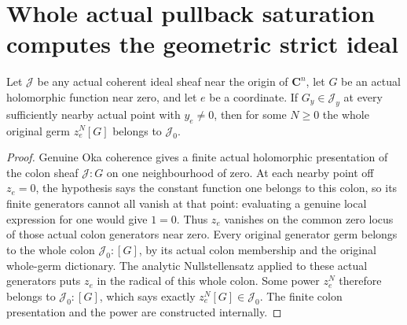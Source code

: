 \section{Whole actual pullback saturation computes the geometric strict ideal}

\begin{theorem}
\label{hir:actual-coherent-off-divisor-membership-power}
\leanok
Let $\mathcal J$ be any actual coherent ideal sheaf near the origin of
$\mathbf C^n$, let $G$ be an actual holomorphic function near zero, and
let $e$ be a coordinate. If $G_y\in\mathcal J_y$ at every sufficiently
nearby actual point with $y_e\ne0$, then for some $N\ge0$ the whole
original germ $z_e^N[G]$ belongs to $\mathcal J_0$.
\end{theorem}
\begin{proof}
Genuine Oka coherence gives a finite actual holomorphic presentation of
the colon sheaf $\mathcal J:G$ on one neighbourhood of zero. At each
nearby point off $z_e=0$, the hypothesis says the constant function one
belongs to this colon, so its finite generators cannot all vanish at
that point: evaluating a genuine local expression for one would give
$1=0$. Thus $z_e$ vanishes on the common zero locus of those actual colon
generators near zero. Every original generator germ belongs to the whole
colon $\mathcal J_0:[G]$, by its actual colon membership and the original
whole-germ dictionary. The analytic Nullstellensatz applied to these
actual generators puts $z_e$ in the radical of this whole colon. Some
power $z_e^N$ therefore belongs to $\mathcal J_0:[G]$, which says exactly
$z_e^N[G]\in\mathcal J_0$. The finite colon presentation and the power
are constructed internally.
\end{proof}

